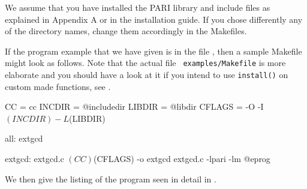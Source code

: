 %
%

We assume that you have installed the PARI library and include files as
explained in Appendix A or in the installation guide. If you chose
differently any of the directory names, change them accordingly in the
Makefiles.

If the program example that we have given is in the file , then
a sample Makefile might look as follows. Note that the actual file {\tt
examples/Makefile} is more elaborate and you should have a look at it if you
intend to use {\tt install()} on custom made functions, see
.

\bprog
CC = cc
INCDIR = @includedir
LIBDIR = @libdir
CFLAGS = -O -I$(INCDIR) -L$(LIBDIR)

all:  extgcd

extgcd:  extgcd.c
      $(CC) $(CFLAGS) -o extgcd extgcd.c -lpari -lm
@eprog

\noindent We then give the listing of the program 
seen in detail in .

\vfill\eject
